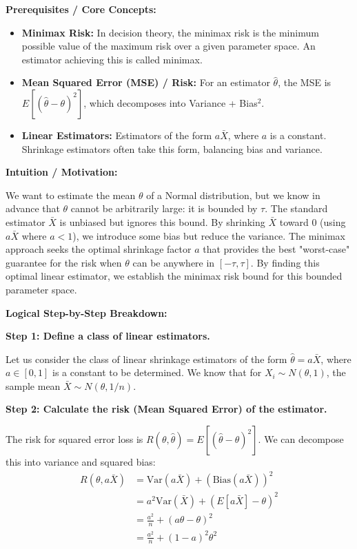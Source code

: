 \begin{solution}
\textbf{Prerequisites / Core Concepts:}
\begin{itemize}
    \item \textbf{Minimax Risk:} In decision theory, the minimax risk is the minimum possible value of the maximum risk over a given parameter space. An estimator achieving this is called minimax.
    \item \textbf{Mean Squared Error (MSE) / Risk:} For an estimator $\hat{\theta}$, the MSE is $E[(\hat{\theta} - \theta)^2]$, which decomposes into Variance + Bias$^2$.
    \item \textbf{Linear Estimators:} Estimators of the form $a \bar{X}$, where $a$ is a constant. Shrinkage estimators often take this form, balancing bias and variance.
\end{itemize}

\textbf{Intuition / Motivation:}

We want to estimate the mean $\theta$ of a Normal distribution, but we know in advance that $\theta$ cannot be arbitrarily large: it is bounded by $\tau$. The standard estimator $\bar{X}$ is unbiased but ignores this bound. By shrinking $\bar{X}$ toward 0 (using $a\bar{X}$ where $a < 1$), we introduce some bias but reduce the variance. The minimax approach seeks the optimal shrinkage factor $a$ that provides the best "worst-case" guarantee for the risk when $\theta$ can be anywhere in $[-\tau, \tau]$. By finding this optimal linear estimator, we establish the minimax risk bound for this bounded parameter space.

\textbf{Logical Step-by-Step Breakdown:}

\textbf{Step 1: Define a class of linear estimators.}

Let us consider the class of linear shrinkage estimators of the form $\hat{\theta} = a\bar{X}$, where $a \in [0, 1]$ is a constant to be determined.
We know that for $X_i \sim N(\theta, 1)$, the sample mean $\bar{X} \sim N(\theta, 1/n)$.

\textbf{Step 2: Calculate the risk (Mean Squared Error) of the estimator.}

The risk for squared error loss is $R(\theta, \hat{\theta}) = E[(\hat{\theta} - \theta)^2]$.
We can decompose this into variance and squared bias:
\begin{align*}
R(\theta, a\bar{X}) &= \text{Var}(a\bar{X}) + (\text{Bias}(a\bar{X}))^2 \\
&= a^2 \text{Var}(\bar{X}) + (E[a\bar{X}] - \theta)^2 \\
&= \frac{a^2}{n} + (a\theta - \theta)^2 \\
&= \frac{a^2}{n} + (1-a)^2 \theta^2
\end{align*}


\end{solution}
